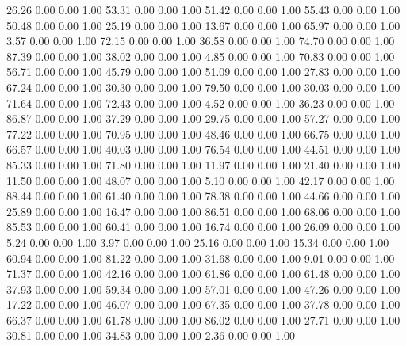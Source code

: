    26.26   0.00   0.00   1.00
   53.31   0.00   0.00   1.00
   51.42   0.00   0.00   1.00
   55.43   0.00   0.00   1.00
   50.48   0.00   0.00   1.00
   25.19   0.00   0.00   1.00
   13.67   0.00   0.00   1.00
   65.97   0.00   0.00   1.00
    3.57   0.00   0.00   1.00
   72.15   0.00   0.00   1.00
   36.58   0.00   0.00   1.00
   74.70   0.00   0.00   1.00
   87.39   0.00   0.00   1.00
   38.02   0.00   0.00   1.00
    4.85   0.00   0.00   1.00
   70.83   0.00   0.00   1.00
   56.71   0.00   0.00   1.00
   45.79   0.00   0.00   1.00
   51.09   0.00   0.00   1.00
   27.83   0.00   0.00   1.00
   67.24   0.00   0.00   1.00
   30.30   0.00   0.00   1.00
   79.50   0.00   0.00   1.00
   30.03   0.00   0.00   1.00
   71.64   0.00   0.00   1.00
   72.43   0.00   0.00   1.00
    4.52   0.00   0.00   1.00
   36.23   0.00   0.00   1.00
   86.87   0.00   0.00   1.00
   37.29   0.00   0.00   1.00
   29.75   0.00   0.00   1.00
   57.27   0.00   0.00   1.00
   77.22   0.00   0.00   1.00
   70.95   0.00   0.00   1.00
   48.46   0.00   0.00   1.00
   66.75   0.00   0.00   1.00
   66.57   0.00   0.00   1.00
   40.03   0.00   0.00   1.00
   76.54   0.00   0.00   1.00
   44.51   0.00   0.00   1.00
   85.33   0.00   0.00   1.00
   71.80   0.00   0.00   1.00
   11.97   0.00   0.00   1.00
   21.40   0.00   0.00   1.00
   11.50   0.00   0.00   1.00
   48.07   0.00   0.00   1.00
    5.10   0.00   0.00   1.00
   42.17   0.00   0.00   1.00
   88.44   0.00   0.00   1.00
   61.40   0.00   0.00   1.00
   78.38   0.00   0.00   1.00
   44.66   0.00   0.00   1.00
   25.89   0.00   0.00   1.00
   16.47   0.00   0.00   1.00
   86.51   0.00   0.00   1.00
   68.06   0.00   0.00   1.00
   85.53   0.00   0.00   1.00
   60.41   0.00   0.00   1.00
   16.74   0.00   0.00   1.00
   26.09   0.00   0.00   1.00
    5.24   0.00   0.00   1.00
    3.97   0.00   0.00   1.00
   25.16   0.00   0.00   1.00
   15.34   0.00   0.00   1.00
   60.94   0.00   0.00   1.00
   81.22   0.00   0.00   1.00
   31.68   0.00   0.00   1.00
    9.01   0.00   0.00   1.00
   71.37   0.00   0.00   1.00
   42.16   0.00   0.00   1.00
   61.86   0.00   0.00   1.00
   61.48   0.00   0.00   1.00
   37.93   0.00   0.00   1.00
   59.34   0.00   0.00   1.00
   57.01   0.00   0.00   1.00
   47.26   0.00   0.00   1.00
   17.22   0.00   0.00   1.00
   46.07   0.00   0.00   1.00
   67.35   0.00   0.00   1.00
   37.78   0.00   0.00   1.00
   66.37   0.00   0.00   1.00
   61.78   0.00   0.00   1.00
   86.02   0.00   0.00   1.00
   27.71   0.00   0.00   1.00
   30.81   0.00   0.00   1.00
   34.83   0.00   0.00   1.00
    2.36   0.00   0.00   1.00
